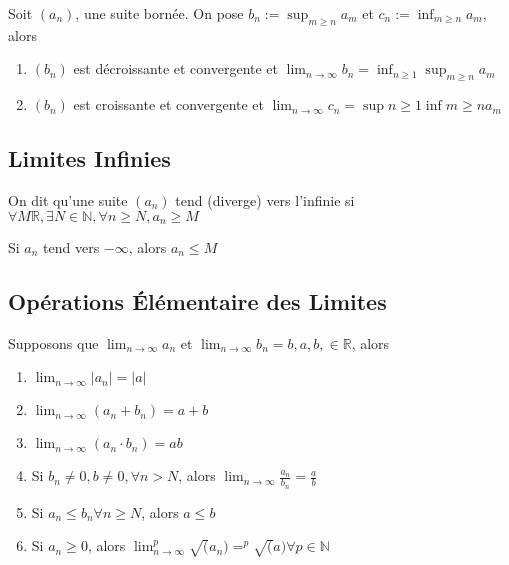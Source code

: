 \documentclass{article}
\begin{document}
\begin{proposition}
    Soit $(a_n)$, une suite bornée. On pose $b_n := \sup_{m \geq n} a_m$ et
    $c_n := \inf_{m \geq n} a_m$, alors
    \begin{enumerate}
	\item $(b_n)$ est décroissante et convergente et
	    $ \lim_{n \to \infty} b_n = \inf_{n \geq 1} \sup_{m \geq n} a_m$
	\item $(b_n)$ est croissante et convergente et
	    $ \lim_{n \to \infty} c_n = \sup{n \geq 1} \inf{m \geq n} a_m$
    \end{enumerate}
\end{proposition}

\subsection{Limites Infinies}

\begin{definition}
    On dit qu'une suite $(a_n)$ tend (diverge) vers l'infinie si
    $\forall M \mathbb{R}, \exists N \in \mathbb{N}, \forall n \geq N, a_n \geq M$
\end{definition}

\begin{remark}
    Si $a_n$ tend vers $-\infty$, alors $a_n \leq M$
\end{remark}

\subsection{Opérations Élémentaire des Limites}

\begin{theorem}
    Supposons que $\lim_{n \to \infty} a_n$ et $\lim_{n \to \infty} b_n =b,
    a,b, \in \mathbb{R}$, alors
    \begin{enumerate}
	\item $\lim_{n \to \infty} |a_n| = |a|$
	\item $\lim_{n \to \infty} (a_n + b_n) = a+b$
	\item $\lim_{n \to \infty} (a_n \cdot b_n) = ab$
	\item Si $b_n \neq 0, b \neq 0, \forall n > N$, alors
	    $\lim_{n \to \infty} \frac{a_n}{b_n} = \frac{a}{b}$
	\item Si $a_n \leq b_n \forall n \geq N$, alors $a \leq b$
	\item Si $a_n \geq 0$, alors $\lim_{n \to \infty} ^p\sqrt(a_n) = ^p\sqrt(a)
	    \forall p \in \mathbb{N}$
    \end{enumerate}
\end{theorem}
\end{document}
